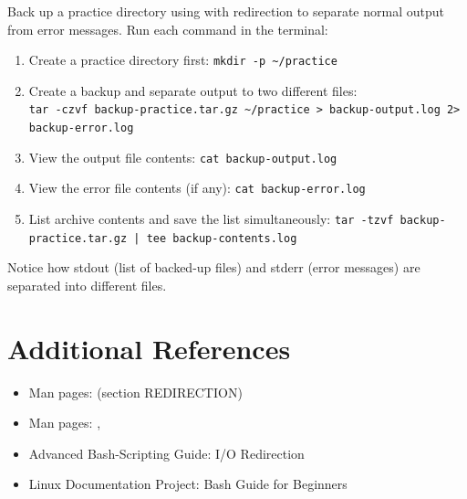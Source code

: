 \begin{exercisebox}[3.5]
	Back up a practice directory using  with redirection to separate normal output from error messages. Run each command in the terminal:
	\begin{enumerate}
		\item Create a practice directory first: \texttt{mkdir -p \textasciitilde/practice}
		\item Create a backup and separate output to two different files:\\
		      \texttt{tar -czvf backup-practice.tar.gz \textasciitilde/practice > backup-output.log 2> backup-error.log}
		\item View the output file contents: \texttt{cat backup-output.log}
		\item View the error file contents (if any): \texttt{cat backup-error.log}
		\item List archive contents and save the list simultaneously: \texttt{tar -tzvf backup-practice.tar.gz | tee backup-contents.log}
	\end{enumerate}

	Notice how stdout (list of backed-up files) and stderr (error messages) are separated into different files.
\end{exercisebox}

\section{Additional References}
\label{sec:io-references}

\begin{itemize}
	\item Man pages:  (section REDIRECTION)
	\item Man pages: , 
	\item Advanced Bash-Scripting Guide: I/O Redirection
	\item Linux Documentation Project: Bash Guide for Beginners
\end{itemize}
